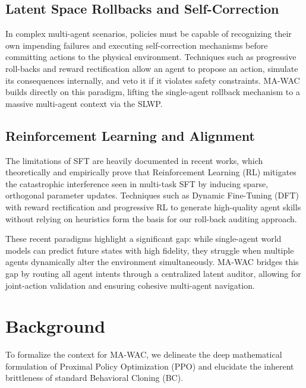 \documentclass[conference]{IEEEtran}
\begin{document}
\subsection{Latent Space Rollbacks and Self-Correction}
In complex multi-agent scenarios, policies must be capable of recognizing their own impending failures and executing self-correction mechanisms before committing actions to the physical environment. Techniques such as progressive roll-backs \cite{skillalpha, ref_19} and reward rectification \cite{ref_20, ref_21} allow an agent to propose an action, simulate its consequences internally, and veto it if it violates safety constraints. MA-WAC builds directly on this paradigm, lifting the single-agent rollback mechanism to a massive multi-agent context via the SLWP.

\subsection{Reinforcement Learning and Alignment}
The limitations of SFT are heavily documented in recent works, which theoretically and empirically prove that Reinforcement Learning (RL) mitigates the catastrophic interference seen in multi-task SFT by inducing sparse, orthogonal parameter updates. Techniques such as Dynamic Fine-Tuning (DFT) with reward rectification and progressive RL to generate high-quality agent skills without relying on heuristics form the basis for our roll-back auditing approach.

These recent paradigms highlight a significant gap: while single-agent world models can predict future states with high fidelity, they struggle when multiple agents dynamically alter the environment simultaneously. MA-WAC bridges this gap by routing all agent intents through a centralized latent auditor, allowing for joint-action validation and ensuring cohesive multi-agent navigation.

\section{Background}\label{sec:background}
To formalize the context for MA-WAC, we delineate the deep mathematical formulation of Proximal Policy Optimization (PPO) and elucidate the inherent brittleness of standard Behavioral Cloning (BC). 
\end{document}
